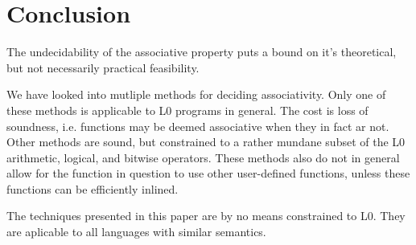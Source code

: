 \section{Conclusion}

The undecidability of the associative property puts a bound on it's
theoretical, but not necessarily practical feasibility.

We have looked into mutliple methods for deciding associativity. Only one of
these methods is applicable to L0 programs in general. The cost is loss of
soundness, i.e. functions may be deemed associative when they in fact ar not.
Other methods are sound, but constrained to a rather mundane subset of the L0
arithmetic, logical, and bitwise operators. These methods also do not in
general allow for the function in question to use other user-defined functions,
unless these functions can be efficiently inlined.

The techniques presented in this paper are by no means constrained to L0. They
are aplicable to all languages with similar semantics.

